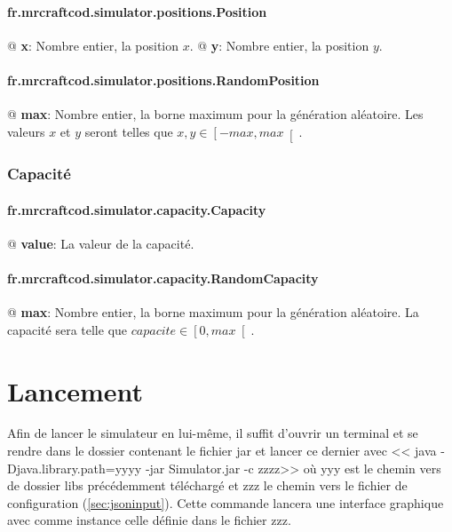\documentclass[final]{polytech/polytech}
\begin{document}
				\paragraph{fr.mrcraftcod.simulator.positions.Position}
					\begin{easylist}[itemize]
						@ \textbf{x}: Nombre entier, la position $x$.
						@ \textbf{y}: Nombre entier, la position $y$.
					\end{easylist}
					
				\paragraph{fr.mrcraftcod.simulator.positions.RandomPosition}
					\begin{easylist}[itemize]
						@ \textbf{max}: Nombre entier, la borne maximum pour la génération aléatoire. Les valeurs $x$ et $y$ seront telles que $x,y\in\left[-max, max\right[$.
					\end{easylist}
			
			\subsubsection{Capacité\label{sec:jsonconf:capacity}}
				\paragraph{fr.mrcraftcod.simulator.capacity.Capacity}
					\begin{easylist}[itemize]
						@ \textbf{value}: La valeur de la capacité.
					\end{easylist}
					
				\paragraph{fr.mrcraftcod.simulator.capacity.RandomCapacity}
					\begin{easylist}[itemize]
						@ \textbf{max}: Nombre entier, la borne maximum pour la génération aléatoire. La capacité sera telle que $capacite\in\left[0, max\right[$.
					\end{easylist}
				
	\section{Lancement}
		Afin de lancer le simulateur en lui-même, il suffit d'ouvrir un terminal et se rendre dans le dossier contenant le fichier jar et lancer ce dernier avec << java -Djava.library.path=yyyy -jar Simulator.jar -c zzzz>> où yyy est le chemin vers de dossier libs précédemment téléchargé et zzz le chemin vers le fichier de configuration (\autoref{sec:jsoninput}).
		Cette commande lancera une interface graphique avec comme instance celle définie dans le fichier zzz.
	
\end{document}

